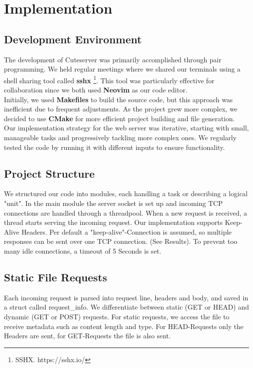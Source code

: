 \section*{Implementation}

\subsection*{Development Environment} 
The development of Cuteserver was primarily accomplished through pair programming. We held regular meetings where we shared our terminals using a shell sharing tool called \textbf{sshx} \footnote{SSHX. https://sshx.io/}. This tool was particularly effective for collaboration since we both used \textbf{Neovim} as our code editor. \\
 
Initially, we used \textbf{Makefiles} to build the source code, but this approach was inefficient due to frequent adjustments. As the project grew more complex, we decided to use \textbf{CMake} for more efficient project building and file generation. \\

Our implementation strategy for the web server was iterative, starting with small, manageable tasks and progressively tackling more complex ones. We regularly tested the code by running it with different inputs to ensure functionality.

\subsection*{Project Structure} 
We structured our code into modules, each handling a task or describing a logical "unit". In the main module the server socket is set up and incoming TCP connections are handled through a threadpool. When a new request is received, a thread starts serving the incoming request. Our implementation supports Keep-Alive Headers. Per default a "keep-alive"-Connection is assumed, so multiple responses can be sent over one TCP connection. (See Results). To prevent too many idle connections, a timeout of 5 Seconds is set. 

\subsection*{Static File Requests}
Each incoming request is parsed into request line, headers and body, and saved in a struct called request\_info. We differentiate between static (GET or HEAD) and dynamic (GET or POST) requests. 
For static requests, we access the file to receive metadata such as content length and type. For HEAD-Requests only the Headers are sent, for GET-Requests the file is also sent.  

